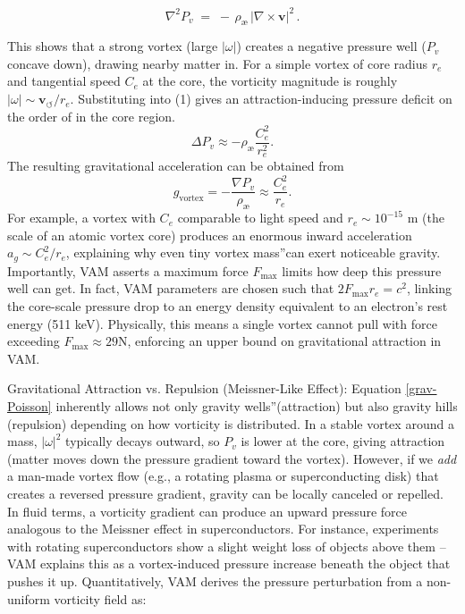 \begin{equation}\label{grav-Poisson}
\nabla^2 P_v \;=\; -\,\rho_{\text{\ae}}\,|\nabla\times \mathbf{v}|^2\,.
\end{equation}

This shows that a strong vortex (large $|\omega|$) creates a negative pressure well ($P_v$ concave down), drawing nearby matter in. For a simple vortex of core radius $r_e$ and tangential speed $C_e$ at the core, the vorticity magnitude is roughly $|\omega| \sim \mathbf{v}_{\scriptscriptstyle\boldsymbol{\circlearrowleft}} / r_e$. Substituting into (1) gives an attraction-inducing pressure deficit on the order of in the core region.
\begin{equation}
    \Delta P_v \approx - \rho_\text{\ae} \frac{C_e^2}{r_e^2}.\label{eq:pressure-deficit}
\end{equation}
The resulting gravitational acceleration can be obtained from
\begin{equation}
    g_\text{vortex} = -\frac{\nabla P_v}{\rho_\text{\ae}} \approx \frac{C_e^2}{r_e}.
    \label{eq:gravity_vortex}
\end{equation}
 For example, a vortex with $C_e$ comparable to light speed and $r_e \sim 10^{-15}$ m (the scale of an atomic vortex core) produces an enormous inward acceleration $a_g \sim C_e^2 / r_e$, explaining why even tiny \grqq vortex mass\textquotedblright can exert noticeable gravity. Importantly, VAM asserts a maximum force $F_{\max}$ limits how deep this pressure well can get. In fact, VAM parameters are chosen such that $2 F_{\max} r_e = c^2$, linking the core-scale pressure drop to an energy density equivalent to an electron's rest energy (511 keV). Physically, this means a single vortex cannot pull with force exceeding $F_{\max} \approx 29 \text{N}$, enforcing an upper bound on gravitational attraction in VAM.

Gravitational Attraction vs. Repulsion (Meissner-Like Effect): Equation \eqref{grav-Poisson} inherently allows not only gravity \grqq wells\textquotedblright (attraction) but also gravity hills (repulsion) depending on how vorticity is distributed. In a stable vortex around a mass, $|\omega|^2$ typically decays outward, so $P_v$ is lower at the core, giving attraction (matter moves down the pressure gradient toward the vortex). However, if we \textit{add} a man-made vortex flow (e.g., a rotating plasma or superconducting disk) that creates a reversed pressure gradient, gravity can be locally canceled or repelled. In fluid terms, a vorticity gradient can produce an upward pressure force analogous to the Meissner effect in superconductors. For instance, experiments with rotating superconductors show a slight weight loss of objects above them – VAM explains this as a vortex-induced pressure increase beneath the object that pushes it up. Quantitatively, VAM derives the pressure perturbation from a non-uniform vorticity field as:

